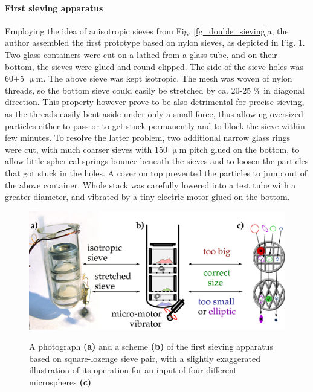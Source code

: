 \paragraph{First sieving apparatus}%
Employing the idea of anisotropic sieves from Fig. \ref{fg_double_sieving}a, the author assembled the first prototype based on nylon sieves, as depicted in Fig. \ref{fg_sieving1}. Two glass containers were cut on a lathed from a 
glass tube, and on their bottom, the sieves were glued and round-clipped. The side of the sieve holes was 60$\pm$5 $\upmu$m. The above sieve was kept isotropic. 
The mesh was woven of nylon threads, so the bottom sieve could easily be stretched by ca. 20-25 \% in diagonal direction. 
This  property however prove to be also detrimental for precise sieving, as the threads easily bent aside under only a small force, thus allowing oversized particles either to pass or to get stuck permanently and to block the sieve within few minutes. To resolve the latter problem, two additional narrow glass rings were cut, with much coarser sieves  with 150 $\upmu$m pitch glued on the bottom, to allow little spherical springs bounce beneath the sieves and to loosen the particles that got stuck in the holes. A cover on top prevented the particles to jump out of the above container. Whole stack was carefully lowered into a test tube with a greater diameter, and vibrated by a tiny electric motor glued on the bottom.
\begin{figure} \caption{A photograph \textbf{(a)} and a scheme \textbf{(b)} of the first sieving apparatus based on square-lozenge sieve pair, with a slightly exaggerated illustration of its operation for an input of four different microspheres \textbf{(c)}}  \centering \includegraphics[width=12cm]{img/expe/sieving1.pdf} \label{fg_sieving1} \end{figure} 

